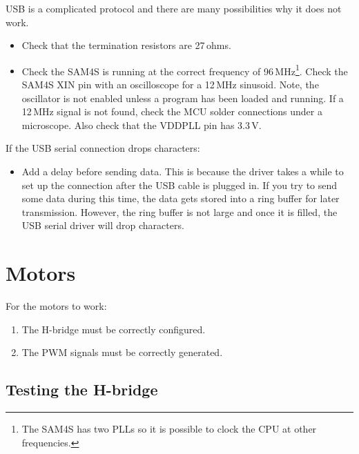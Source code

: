 USB is a complicated protocol and there are many possibilities why it
does not work.

  \begin{itemize}
  \item
    Check that the termination resistors are 27\,ohms.
    
  \item Check the SAM4S is running at the correct frequency of
    96\,MHz\footnote{The SAM4S has two PLLs so it is possible to clock
      the CPU at other frequencies.}.  Check the SAM4S XIN pin with an
    oscilloscope for a 12\,MHz sinusoid.  Note, the oscillator is not
    enabled unless a program has been loaded and running. If a 12\,MHz
    signal is not found, check the MCU solder connections under a
    microscope. Also check that the VDDPLL pin has 3.3\,V.
  \end{itemize}

  If the USB serial connection drops characters:
 \begin{itemize}
 \item Add a delay before sending data.  This is because the driver
   takes a while to set up the connection after the USB cable is
   plugged in.  If you try to send some data during this time, the
   data gets stored into a ring buffer for later transmission.
   However, the ring buffer is not large and once it is filled, the
   USB serial driver will drop characters.
 \end{itemize}

 
\section{Motors}
\label{motors-testing}

For the motors to work:
%
\begin{enumerate}
\item The H-bridge must be correctly configured.  
\item The PWM signals must be correctly generated.
\end{enumerate}


\subsection{Testing the H-bridge}
\label{testing-the-h-bridge}

